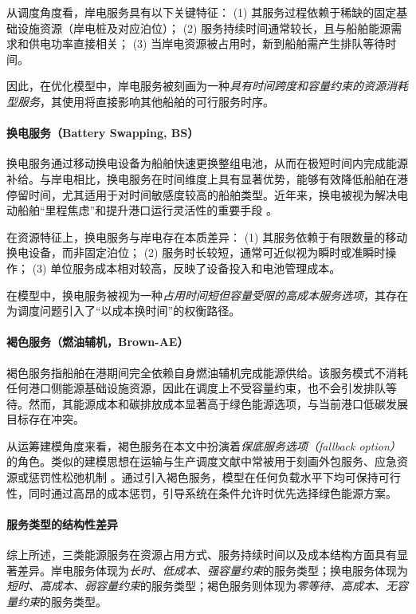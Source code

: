 \documentclass[UTF8, a4paper, 12pt]{ctexart}
\begin{document}
从调度角度看，岸电服务具有以下关键特征：  
(1) 其服务过程依赖于稀缺的固定基础设施资源（岸电桩及对应泊位）；  
(2) 服务持续时间通常较长，且与船舶能源需求和供电功率直接相关；  
(3) 当岸电资源被占用时，新到船舶需产生排队等待时间。

因此，在优化模型中，岸电服务被刻画为一种\emph{具有时间跨度和容量约束的资源消耗型服务}，其使用将直接影响其他船舶的可行服务时序。

\paragraph{换电服务（Battery Swapping, BS）}
换电服务通过移动换电设备为船舶快速更换整组电池，从而在极短时间内完成能源补给。与岸电相比，换电服务在时间维度上具有显著优势，能够有效降低船舶在港停留时间，尤其适用于对时间敏感度较高的船舶类型。近年来，换电被视为解决电动船舶“里程焦虑”和提升港口运行灵活性的重要手段 \cite{Wu2020_Review,Zhang2022_Electrification}。

在资源特征上，换电服务与岸电存在本质差异：  
(1) 其服务依赖于有限数量的移动换电设备，而非固定泊位；  
(2) 服务时长较短，通常可近似视为瞬时或准瞬时操作；  
(3) 单位服务成本相对较高，反映了设备投入和电池管理成本。

在模型中，换电服务被视为一种\emph{占用时间短但容量受限的高成本服务选项}，其存在为调度问题引入了“以成本换时间”的权衡路径。

\paragraph{褐色服务（燃油辅机，Brown-AE）}
褐色服务指船舶在港期间完全依赖自身燃油辅机完成能源供给。该服务模式不消耗任何港口侧能源基础设施资源，因此在调度上不受容量约束，也不会引发排队等待。然而，其能源成本和碳排放成本显著高于绿色能源选项，与当前港口低碳发展目标存在冲突。

从运筹建模角度来看，褐色服务在本文中扮演着\emph{保底服务选项（fallback option）}的角色。类似的建模思想在运输与生产调度文献中常被用于刻画外包服务、应急资源或惩罚性松弛机制 \cite{Cordeau2015,pinedo2016scheduling}。通过引入褐色服务，模型在任何负载水平下均可保持可行性，同时通过高昂的成本惩罚，引导系统在条件允许时优先选择绿色能源方案。

\paragraph{服务类型的结构性差异}
综上所述，三类能源服务在资源占用方式、服务持续时间以及成本结构方面具有显著差异。岸电服务体现为\emph{长时、低成本、强容量约束}的服务类型；换电服务体现为\emph{短时、高成本、弱容量约束}的服务类型；褐色服务则体现为\emph{零等待、高成本、无容量约束}的服务类型。
\end{document}
